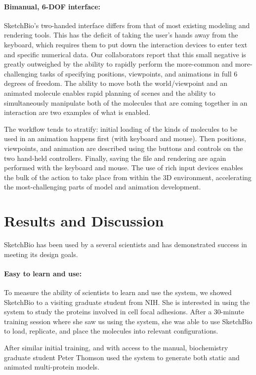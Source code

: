 \documentclass[twocolumn]{bmcart}%
\begin{document}
\paragraph*{Bimanual, 6-DOF interface:} SketchBio's two-handed interface differs from that of most existing modeling and rendering tools. This has the deficit of taking the user's hands away from the keyboard, which requires them to put down the interaction devices to enter text and specific numerical data. Our collaborators report that this small negative is greatly outweighed by the ability to rapidly perform the more-common and more-challenging tasks of specifying positions, viewpoints, and animations in full 6 degrees of freedom. The ability to move both the world/viewpoint and an animated molecule enables rapid planning of scenes and the ability to simultaneously manipulate both of the molecules that are coming together in an interaction are two examples of what is enabled.

The workflow tends to stratify: initial loading of the kinds of molecules to be used in an animation happens first (with keyboard and mouse). Then positions, viewpoints, and animation are described using the buttons and controls on the two hand-held controllers. Finally, saving the file and rendering are again performed with the keyboard and mouse. The use of rich input devices enables the bulk of the action to take place from within the 3D environment, accelerating the most-challenging parts of model and animation development.

\section*{Results and Discussion}
SketchBio has been used by a several scientists and has demonstrated success in meeting its design goals.

\paragraph*{Easy to learn and use:}
To measure the ability of scientists to learn and use the system, we showed SketchBio to a visiting graduate student from NIH.  She is interested in using the system to study the proteins involved in cell focal adhesions.
After a 30-minute training session where she saw us using the system, she was able to use SketchBio to load, replicate, and place the molecules into relevant configurations.

After similar initial training, and with access to the manual, biochemistry graduate student Peter Thomson used the system to generate both static and animated multi-protein models.
\end{document}

